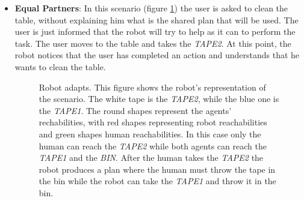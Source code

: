 \begin{itemize}
  \item
\textbf{Equal Partners}:
In this scenario (figure \ref{fig:case_study-helper-scenario1}) the user is asked to clean the table, without explaining him what is the shared plan that will be used. The user is just informed that
the robot will try to help as it can to perform the task. The user moves to the table and
takes the \textit{TAPE2}. At this point, the robot notices that the user
has completed an action and understands that he wants to clean the
table.
\begin{figure}
  \caption[Robot helper experiment 1]{Robot adapts. This figure shows the robot's representation of the scenario. The white tape is the \textit{TAPE2}, while the blue
    one is the \textit{TAPE1}. The round shapes represent the agents'
    rechabilities, with red shapes representing robot reachabilities
    and green shapes human reachabilities. In this case only the human
  can reach the \textit{TAPE2} while both agents can reach the \textit{TAPE1}
and the \textit{BIN}. After the human takes the \textit{TAPE2} the
robot produces a plan where the human must throw the tape in the
bin while the robot can take the \textit{TAPE1} and throw it in the
bin.
}
\centering
  \label{fig:case_study-helper-scenario1}
\end{figure}


\end{itemize}
